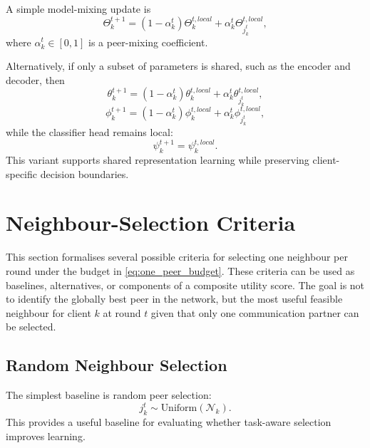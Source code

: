 \documentclass[conference]{IEEEtran}
\begin{document}
A simple model-mixing update is
\begin{equation}
    \Theta_k^{t+1}
    =
    (1-\alpha_k^t)\Theta_k^{t,local}
    +
    \alpha_k^t \Theta_{j_k^t}^{t,local},
    \label{eq:model_mixing}
\end{equation}
where \(\alpha_k^t\in[0,1]\) is a peer-mixing coefficient.

Alternatively, if only a subset of parameters is shared, such as the encoder and decoder, then
\begin{equation}
    \theta_k^{t+1}
    =
    (1-\alpha_k^t)\theta_k^{t,local}
    +
    \alpha_k^t \theta_{j_k^t}^{t,local},
    \label{eq:auto-016}
\end{equation}
\begin{equation}
    \phi_k^{t+1}
    =
    (1-\alpha_k^t)\phi_k^{t,local}
    +
    \alpha_k^t \phi_{j_k^t}^{t,local},
    \label{eq:auto-017}
\end{equation}
while the classifier head remains local:
\begin{equation}
    \psi_k^{t+1}=\psi_k^{t,local}.
    \label{eq:auto-018}
\end{equation}
This variant supports shared representation learning while preserving client-specific decision boundaries.

\section{Neighbour-Selection Criteria}
\label{sec:neighbour-selection-criteria}

This section formalises several possible criteria for selecting one neighbour per round under the budget in \eqref{eq:one_peer_budget}. These criteria can be used as baselines, alternatives, or components of a composite utility score. The goal is not to identify the globally best peer in the network, but the most useful feasible neighbour for client $k$ at round $t$ given that only one communication partner can be selected.

\subsection{Random Neighbour Selection}
\label{subsec:random-neighbour-selection}
The simplest baseline is random peer selection:
\begin{equation}
    j_k^t \sim \text{Uniform}(\mathcal{N}_k).
    \label{eq:auto-019}
\end{equation}
This provides a useful baseline for evaluating whether task-aware selection improves learning.
\end{document}
